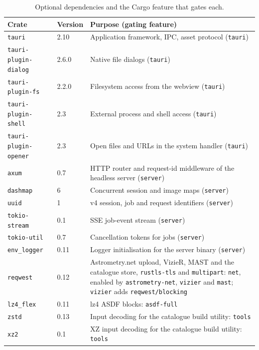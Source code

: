 \documentclass[11pt,a4paper]{article}
\newcommand{\code}[1]{\texttt{\small #1}}
\newcommand{\crate}[1]{\texttt{#1}}
\begin{document}
    \begin{table}[htbp]
        \centering
        \small
        \begin{tabularx}{\textwidth}{llX}
    \toprule
    \textbf{Crate} & \textbf{Version} & \textbf{Purpose (gating feature)} \\
    \midrule
    \crate{tauri} & 2.10 & Application framework, IPC, asset protocol (\code{tauri}) \\
    \crate{tauri-plugin-dialog} & 2.6.0 & Native file dialogs (\code{tauri}) \\
    \crate{tauri-plugin-fs} & 2.2.0 & Filesystem access from the webview (\code{tauri}) \\
    \crate{tauri-plugin-shell} & 2.3 & External process and shell access (\code{tauri}) \\
    \crate{tauri-plugin-opener} & 2.3 & Open files and URLs in the system handler (\code{tauri}) \\
    \crate{axum} & 0.7 & HTTP router and request-id middleware of the headless server (\code{server}) \\
    \crate{dashmap} & 6 & Concurrent session and image maps (\code{server}) \\
    \crate{uuid} & 1 & v4 session, job and request identifiers (\code{server}) \\
    \crate{tokio-stream} & 0.1 & SSE job-event stream (\code{server}) \\
    \crate{tokio-util} & 0.7 & Cancellation tokens for jobs (\code{server}) \\
    \crate{env\_logger} & 0.11 & Logger initialisation for the server binary (\code{server}) \\
    \crate{reqwest} & 0.12 & Astrometry.net upload, VizieR, MAST and the catalogue store, \code{rustls-tls} and \code{multipart}: \code{net}, enabled by \code{astrometry-net}, \code{vizier} and \code{mast}; \code{vizier} adds \code{reqwest/blocking} \\
    \crate{lz4\_flex} & 0.11 & lz4 ASDF blocks: \code{asdf-full} \\
    \crate{zstd} & 0.13 & Input decoding for the catalogue build utility: \code{tools} \\
    \crate{xz2} & 0.1 & XZ input decoding for the catalogue build utility: \code{tools} \\
    \bottomrule
        \end{tabularx}
        \caption{Optional dependencies and the Cargo feature that gates each.}
    \end{table}
\end{document}

